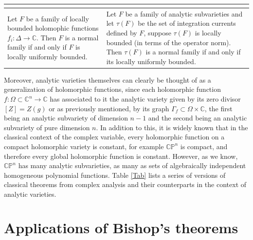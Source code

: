 \documentclass[12pt,twoside,a4paper]{report}
\newcommand{\co}{\ensuremath{\mathbb C }}
\newcommand{\con}{\ensuremath{\mathbb{C}^n}}
\newcommand{\cp}{\ensuremath{\mathbb{CP}}}
\newcommand{\om}{\ensuremath{\Omega}}
\begin{document}
\begin{table}[h!]
\begin{tabular}{| m{5cm} | m{5cm} |}
\begin{center}
                              \end{center}\\
                              \midrule
                                      Let $F$ be a family of locally bounded
                                      holomophic functions $f_i:\Delta\rightarrow\co$.
                                      Then $F$ is a normal family if and only if $F$ is locally uniformly bounded.
                                          &
                                      Let $F$ be a family of analytic subvarieties and let $\tau(F)$
                                      be the set of integration currents defined by $F$, suppose $\tau(F)$
                                      is locally bounded (in terms of the operator norm).
                                      Then $\tau(F)$ is a normal family if and only if its locally uniformly bounded.\\
                              \bottomrule
              \end{tabular}
  \end{table}

  Moreover, analytic varieties themselves can clearly be thought of as a generalization of holomorphic functions, since each holomorphic function $f:\om\subset\con\rightarrow\co$ has associated to it the analytic variety given by its zero divisor $[Z]=Z(g)$ or as previously mentioned, by its graph $\Gamma_{f}\subset\om\times\co$, the first being an analytic subvariety of dimension $n-1$ and the second being an analytic subvariety of pure dimension $n$. In addition to this, it is widely known that in the classical context of the complex variable, every holomorphic function on a compact holomorphic variety is constant, for example $\cp^n$ is compact, and therefore every global holomorphic function is constant. However, as we know, $\cp^n$ has many analytic subvarieties, as many as sets of algebraically independent homogeneous polynomial functions. Table \ref{Tab} lists a series of versions of classical theorems from complex analysis and their counterparts in the context of analytic varieties.

  \chapter{Applications of Bishop's theorems}
  \pagestyle{fancy}
  \fancyhf{}
  \fancyhead[LE]{\rightmark}
  \fancyhead[RO]{\leftmark}
  \fancyfoot[C]{\thepage}
\end{document}
